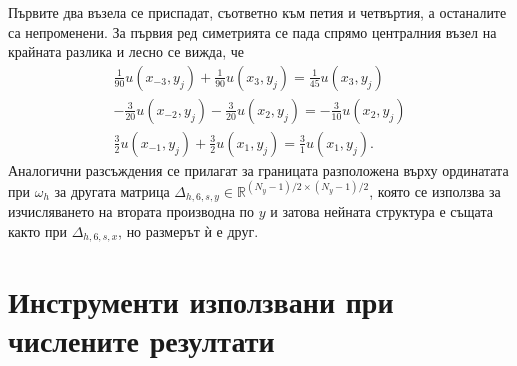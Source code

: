 \documentclass{article}
\newcommand{\RR}{\mathbb{R}}
\begin{document}
Първите два възела се приспадат, съответно към петия и четвъртия, а останалите са непроменени. За първия ред симетрията се пада спрямо централния възел на крайната разлика и лесно се вижда, че
\begin{align}
\frac{1}{90}u(x_{-3}, y_j) +\frac{1}{90}u(x_3, y_j) = \frac{1}{45}u(x_3, y_j) \nonumber\\
-\frac{3}{20}u(x_{-2}, y_j) - \frac{3}{20}u(x_2, y_j) = -\frac{3}{10}u(x_2, y_j) \nonumber\\
\frac{3}{2}u(x_{-1}, y_j) + \frac{3}{2}u(x_1, y_j) = \frac{3}{1}u(x_1, y_j). \nonumber
\end{align}
Аналогични разсъждения се прилагат за границата разположена върху ординатата при $\omega_h$ за другата матрица $\Delta_{h,6,s,y} \in \RR^{(N_y-1)/2 \times (N_y-1)/2}$, която се използва за изчисляването на втората производна по $y$ и затова нейната структура е същата както при $\Delta_{h,6,s,x}$, но размерът ѝ е друг. 

\section{Инструменти използвани при числените резултати}
\end{document}
